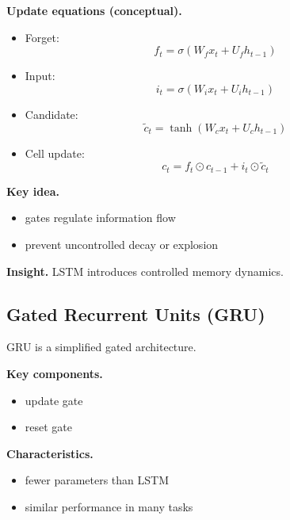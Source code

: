 \medskip

\noindent
\textbf{Update equations (conceptual).}

\begin{itemize}
    \item Forget:
    \[
    f_t = \sigma(W_f x_t + U_f h_{t-1})
    \]

    \item Input:
    \[
    i_t = \sigma(W_i x_t + U_i h_{t-1})
    \]

    \item Candidate:
    \[
    \tilde{c}_t = \tanh(W_c x_t + U_c h_{t-1})
    \]

    \item Cell update:
    \[
    c_t = f_t \odot c_{t-1} + i_t \odot \tilde{c}_t
    \]
\end{itemize}

\medskip

\noindent
\textbf{Key idea.}

\begin{itemize}
    \item gates regulate information flow
    \item prevent uncontrolled decay or explosion
\end{itemize}

\medskip

\noindent
\textbf{Insight.}  
LSTM introduces controlled memory dynamics.

\subsection{Gated Recurrent Units (GRU)}

GRU is a simplified gated architecture.

\medskip

\noindent
\textbf{Key components.}

\begin{itemize}
    \item update gate
    \item reset gate
\end{itemize}

\medskip

\noindent
\textbf{Characteristics.}

\begin{itemize}
    \item fewer parameters than LSTM
    \item similar performance in many tasks
\end{itemize}

